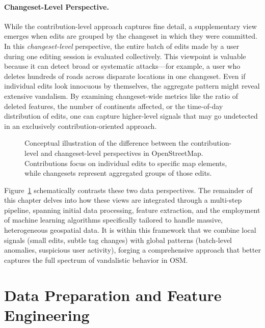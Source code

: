\documentclass[
    13pt, %
    a4paper, %
    twoside, 
    DIV14, %
    listof=totoc, %
    bibliography=totoc, %
    index=totoc, %
    headsepline
]{scrreprt}
\begin{document}
\paragraph{Changeset-Level Perspective.}
While the contribution-level approach captures fine detail, a supplementary view emerges when edits are grouped by the changeset in which they were committed. In this \emph{changeset-level} perspective, the entire batch of edits made by a user during one editing session is evaluated collectively. This viewpoint is valuable because it can detect broad or systematic attacks—for example, a user who deletes hundreds of roads across disparate locations in one changeset. Even if individual edits look innocuous by themselves, the aggregate pattern might reveal extensive vandalism. By examining changeset-wide metrics like the ratio of deleted features, the number of continents affected, or the time-of-day distribution of edits, one can capture higher-level signals that may go undetected in an exclusively contribution-oriented approach.

\vspace{1em}
\begin{figure}[htbp]
    \centering
    \caption{Conceptual illustration of the difference between the contribution-level and changeset-level perspectives in OpenStreetMap. Contributions focus on individual edits to specific map elements, while changesets represent aggregated groups of those edits.}
    \label{fig:contrib_vs_changeset}
\end{figure}

\vspace{1em}
\noindent
Figure~\ref{fig:contrib_vs_changeset} schematically contrasts these two data perspectives. The remainder of this chapter delves into how these views are integrated through a multi-step pipeline, spanning initial data processing, feature extraction, and the employment of machine learning algorithms specifically tailored to handle massive, heterogeneous geospatial data. It is within this framework that we combine local signals (small edits, subtle tag changes) with global patterns (batch-level anomalies, suspicious user activity), forging a comprehensive approach that better captures the full spectrum of vandalistic behavior in OSM.

\section{Data Preparation and Feature Engineering}
\label{sec:data_preparation}
\end{document}
